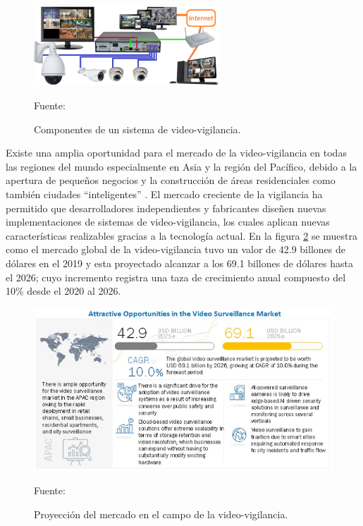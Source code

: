 \begin{figure}[H]
    \begin{center}
        \includegraphics[width=7cm]{img/capitulo_2/sis_videovigilancia.png}
    \end{center}
    \begin{center}
        \caption{Componentes de un sistema de video-vigilancia.}
        Fuente: \cite{videosurvellance}
        \label{fig:sistema_video_vigilancia}
    \end{center}
\end{figure}

Existe una amplia oportunidad para el mercado de la video-vigilancia en todas las regiones del mundo especialmente en Asia y la región del Pacífico, debido a la apertura de pequeños negocios y la construcción de áreas residenciales como también ciudades ``inteligentes'' \cite{marketsandmarkets:market-surveillance}. El mercado creciente de la vigilancia ha permitido que desarrolladores independientes y fabricantes diseñen nuevas implementaciones de sistemas de video-vigilancia, los cuales aplican nuevas características realizables gracias a la tecnología actual. En la figura \ref{fig:surveillance-market} se muestra como el mercado global de la video-vigilancia tuvo un valor de 42.9 billones de dólares en el 2019 y esta proyectado alcanzar a los 69.1 billones de dólares hasta el 2026; cuyo incremento registra una taza de crecimiento anual compuesto del 10\% desde el 2020 al 2026. \cite{marketsandmarkets:market-surveillance}\\

\begin{figure}[H]
    \begin{center}
        \includegraphics[width=12cm]{img/capitulo_2/surveillance-market.jpg}
    \end{center}
    \begin{center}
        \caption{Proyección del mercado en el campo de la video-vigilancia.}
        Fuente: \cite{marketsandmarkets:market-surveillance}
        \label{fig:surveillance-market}
    \end{center}
\end{figure}

